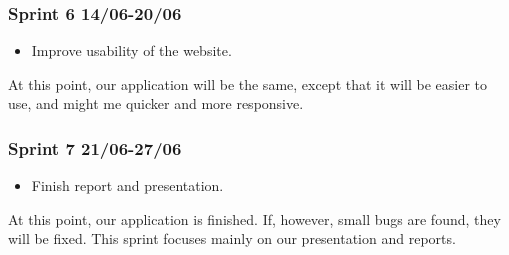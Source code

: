 	\subsubsection*{Sprint 6 14/06-20/06}
		\begin{itemize}
			\item Improve usability of the website.
		\end{itemize}
		At  this point, our application will be the same, except that it will be easier to use, and might me quicker and more responsive.
	
	\subsubsection*{Sprint 7 21/06-27/06}
		\begin{itemize}
			\item Finish report and presentation.
		\end{itemize}
		At this point, our application is finished. If, however, small bugs are found, they will be fixed. This sprint focuses mainly on our presentation and reports.